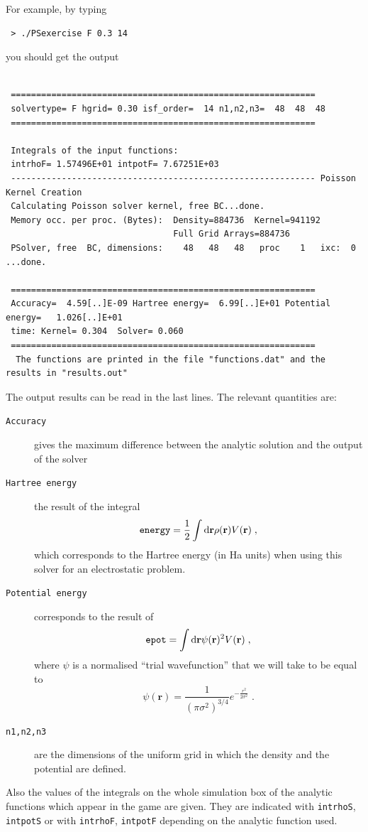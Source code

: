 \documentclass[a4paper]{article}
\newcommand{\dd}{{\rm d}}
\newcommand{\be}{\begin{equation}}
\newcommand{\ee}{\end{equation}}
\begin{document}
For example, by typing
\begin{verbatim}
 > ./PSexercise F 0.3 14
\end{verbatim}
you should get the output
\begin{verbatim}
 
 ============================================================
 solvertype= F hgrid= 0.30 isf_order=  14 n1,n2,n3=  48  48  48
 ============================================================

 Integrals of the input functions:
 intrhoF= 1.57496E+01 intpotF= 7.67251E+03
 ------------------------------------------------------------ Poisson Kernel Creation
 Calculating Poisson solver kernel, free BC...done.
 Memory occ. per proc. (Bytes):  Density=884736  Kernel=941192
                                 Full Grid Arrays=884736
 PSolver, free  BC, dimensions:    48   48   48   proc    1   ixc:  0 ...done.

 ============================================================
 Accuracy=  4.59[..]E-09 Hartree energy=  6.99[..]E+01 Potential energy=   1.026[..]E+01
 time: Kernel= 0.304  Solver= 0.060
 ============================================================
  The functions are printed in the file "functions.dat" and the results in "results.out"

\end{verbatim}
The output results can be read in the last lines. The relevant quantities are:
\begin{description}
\item[\texttt{Accuracy}] gives the maximum difference between the analytic solution and the output of the solver
\item[\texttt{Hartree energy}] the result of the integral
\be
\text{\texttt{energy}}=\frac{1}{2}\int \dd \mathbf{r} \rho(\mathbf{r}) V(\mathbf{r})\;,
\ee
which corresponds to the Hartree energy (in Ha units) when using this solver for an electrostatic problem.
\item[\texttt{Potential energy}] corresponds to the result of
\be
\texttt{epot}= \int \dd \mathbf{r} \psi(\mathbf{r})^2 V(\mathbf{r})\;,
\ee
where $\psi$ is a normalised ``trial wavefunction'' that we will take to be equal to
\be
\psi(\mathbf{r})=\frac{1}{(\pi \sigma^2)^{3/4}} e^{-\frac{r^2}{2 \sigma^2}}\;.
\ee
\item[\texttt{n1,n2,n3}] are the dimensions of the uniform grid in which the density and the potential are defined.
\end{description}
Also the values of the integrals on the whole simulation box of the analytic functions which appear in the game are given. They are indicated with \texttt{intrhoS}, \texttt{intpotS} or with \texttt{intrhoF}, \texttt{intpotF} depending on the analytic function used.
\end{document}
